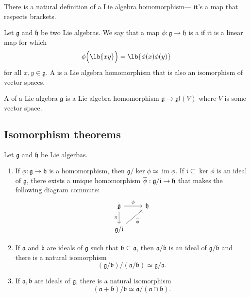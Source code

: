 \documentclass{article}
\DeclarePairedDelimiter\lb\lbrack\rbrack
\DeclareMathOperator{\im}{im}
\newcommand*\frka{{\ensuremath{\mathfrak{a}}}}
\newcommand*\frkb{{\ensuremath{\mathfrak{b}}}}
\newcommand*\frkg{{\ensuremath{\mathfrak{g}}}}
\newcommand*\frkh{{\ensuremath{\mathfrak{h}}}}
\newcommand*\frki{{\ensuremath{\mathfrak{i}}}}
\newcommand*\gl{\ensuremath{\mathfrak{gl}}}
\begin{document}
There is a natural definition of a Lie algebra homomorphism--- it's a map that respects brackets.

\begin{definition}
    \label{def:LieAlgHom}
    Let $\frkg$ and $\frkh$ be two Lie algebras.
    We say that a map $\phi: \frkg \to \frkh$ is a  if it is a linear map for which
    \[
        \phi\Big(\lb{xy}\Big)
        =
        \lb{\phi(x)\phi(y)}
    \]
    for all $x,y \in \frkg$. 
    A  is a Lie algebra homomorphism that is also an isomorphism of vector spaces.
\end{definition}


\begin{definition}
    A  of a Lie algebra $\frkg$ is a Lie algebra homomorphism $\frkg \to \gl(V)$ where $V$ is some vector space.
\end{definition}

\subsection{Isomorphism theorems}

\begin{theorem}
    Let $\frkg$ and $\frkh$ be Lie algerbas.
    \begin{enumerate}[label=(\alph*)]
        \item \label{thm:FirstIsomorphismThm}
            If $\phi: \frkg \to \frkh$ is a homomorphism, then $\frkg / \ker \phi \simeq \im \phi$.
            If $\frki \subseteq \ker \phi$ is an ideal of $\frkg$, there exists a unique homomorphism $\barphi: \frkg/\frki \to \frkh$ that makes the following diagram commute:
            \[
                \begin{tikzcd}
                    \frkg \arrow[r, "\phi"] \arrow[d, "\pi"'] & \frkh \\ 
                                                             \frkg/\frki \arrow[ur, "\barphi"']
                \end{tikzcd}
            \]
        \item 
            If $\frka$ and $\frkb$ are ideals of $\frkg$ such that $\frkb \subseteq \frka$, then $\frka/\frkb$ is an ideal of $\frkg/\frkb$ and there is a natural isomorphism
            \[
                (\frkg/\frkb)/(\frka/\frkb)
                \simeq
                \frkg/\frka.
            \]
        \item 
            If $\frka, \frkb$ are ideals of $\frkg$, there is a natural isomorphism
            \[
                (\frka + \frkb)/\frkb
                \simeq
                \frka/(\frka \cap \frkb).
            \]
    \end{enumerate}
\end{theorem}
\end{document}
